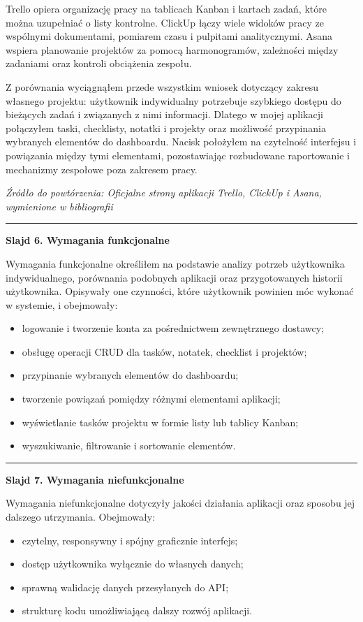 \documentclass[12pt,a4paper]{article}
\newif\iffirstslide
\newcommand{\Slide}[2]{%
  \iffirstslide
    \global\firstslidefalse
  \else
    \par\vspace{1.5\baselineskip}%
    \noindent\rule{\textwidth}{0.8pt}%
    \par\vspace{1.5\baselineskip}%
  \fi
  {\LARGE\bfseries Slajd #1. #2\par}%
  \vspace{2\baselineskip}%
}
\newcommand{\Source}[1]{%
  \par\vspace{0.5\baselineskip}%
  {\small\itshape Źródło do powtórzenia: #1\par}%
}
\begin{document}
Trello opiera organizację pracy na tablicach Kanban i kartach zadań, które można uzupełniać o listy kontrolne. ClickUp łączy wiele widoków pracy ze wspólnymi dokumentami, pomiarem czasu i pulpitami analitycznymi. Asana wspiera planowanie projektów za pomocą harmonogramów, zależności między zadaniami oraz kontroli obciążenia zespołu.

Z porównania wyciągnąłem przede wszystkim wniosek dotyczący zakresu własnego projektu: użytkownik indywidualny potrzebuje szybkiego dostępu do bieżących zadań i związanych z nimi informacji. Dlatego w mojej aplikacji połączyłem taski, checklisty, notatki i projekty oraz możliwość przypinania wybranych elementów do dashboardu. Nacisk położyłem na czytelność interfejsu i powiązania między tymi elementami, pozostawiając rozbudowane raportowanie i mechanizmy zespołowe poza zakresem pracy.

\Source{Oficjalne strony aplikacji Trello, ClickUp i Asana, wymienione w bibliografii}

\Slide{6}{Wymagania funkcjonalne}

Wymagania funkcjonalne określiłem na podstawie analizy potrzeb użytkownika indywidualnego, porównania podobnych aplikacji oraz przygotowanych historii użytkownika. Opisywały one czynności, które użytkownik powinien móc wykonać w systemie, i obejmowały:

\begin{itemize}
  \item logowanie i tworzenie konta za pośrednictwem zewnętrznego dostawcy;
  \item obsługę operacji CRUD dla tasków, notatek, checklist i projektów;
  \item przypinanie wybranych elementów do dashboardu;
  \item tworzenie powiązań pomiędzy różnymi elementami aplikacji;
  \item wyświetlanie tasków projektu w formie listy lub tablicy Kanban;
  \item wyszukiwanie, filtrowanie i sortowanie elementów.
\end{itemize}

\Slide{7}{Wymagania niefunkcjonalne}

Wymagania niefunkcjonalne dotyczyły jakości działania aplikacji oraz sposobu jej dalszego utrzymania. Obejmowały:

\begin{itemize}
  \item czytelny, responsywny i spójny graficznie interfejs;
  \item dostęp użytkownika wyłącznie do własnych danych;
  \item sprawną walidację danych przesyłanych do API;
  \item strukturę kodu umożliwiającą dalszy rozwój aplikacji.
\end{itemize}
\end{document}
